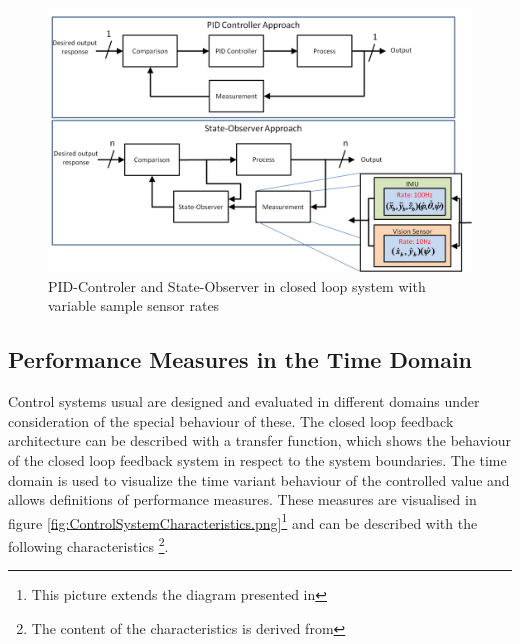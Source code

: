 \begin{figure}[H]
	\centering
		\includegraphics[width=1\textwidth]{graphic/ClosedLoopControlSyst.png}
\caption{PID-Controler and State-Observer in closed loop system with variable sample sensor rates}
	\label{fig:ClosedLoopControlSyst.png}
\end{figure}


\subsection{Performance Measures in the Time Domain}
Control systems usual are designed and evaluated in different domains under
consideration of the special behaviour of these. The closed loop feedback
architecture can be described with a transfer function, which shows the behaviour
of the closed loop feedback system in respect to the system boundaries. The time
domain is used to visualize the time variant behaviour of the controlled value
and allows definitions of performance measures. These measures are visualised in
figure \ref{fig:ControlSystemCharacteristics.png}\footnote{This picture extends
the diagram presented in } and can be described with the following characteristics
\footnote{The content of the characteristics is derived from }.


